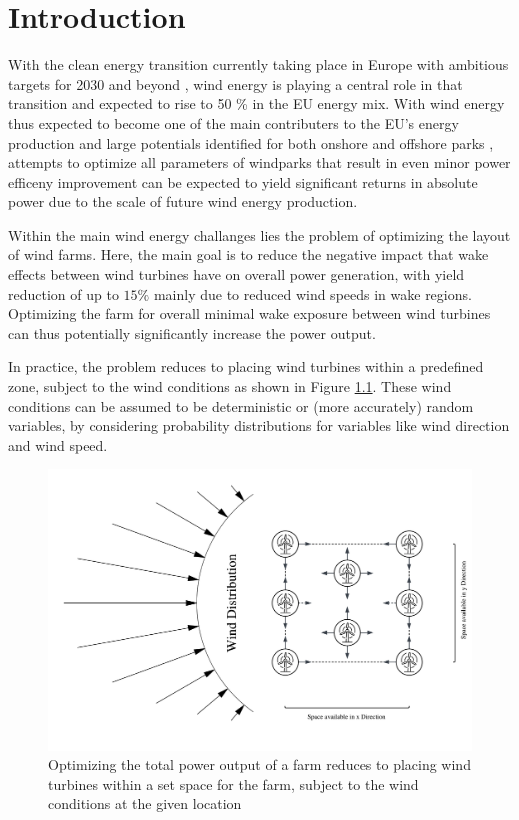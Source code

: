 
\chapter{Introduction}\label{chapter:introduction}


With the clean energy transition currently taking place in Europe with ambitious targets for 2030 and beyond \cite{EU_RE_Targets_2023}, wind energy is playing a central role in that transition and expected to rise to 50 \% in the EU energy mix. \cite{ConsiliumEU_Harnessing_Wind_Power_2024}
With wind energy thus expected to become one of the main contributers to the EU's energy production and large potentials identified for both onshore and offshore parks \cite{EEA_Wind_Energy_Potential_2009}, attempts to optimize all parameters of windparks that result in even minor power efficeny improvement can be expected to yield significant returns in absolute power due to the scale of future wind energy production. 

Within the main wind energy challanges lies the problem of optimizing the layout of wind farms. Here, the main goal is to reduce the negative impact that wake effects between wind turbines have on overall power generation, with yield reduction of up to $15\%$  mainly due to reduced wind speeds in wake regions. Optimizing the farm for overall minimal wake exposure between wind turbines can thus potentially significantly increase the power output. \cite{hou_review_2019} \cite{KIM2024123383} 

In practice, the problem reduces to placing wind turbines within a predefined zone, subject to the wind conditions as shown in Figure \ref{fig:intro_plot}. These wind conditions can be assumed to be deterministic or (more accurately) random variables, by considering probability distributions for variables like wind direction and wind speed.


\begin{figure}[h] 
	\centering
	\includegraphics[width=1\textwidth]{../figures/introduction/intro_plot.png} 
	\caption{Optimizing the total power output of a farm reduces to placing wind turbines within a set space for the farm, subject to the wind conditions at the given location}
	\label{fig:intro_plot}
\end{figure}

